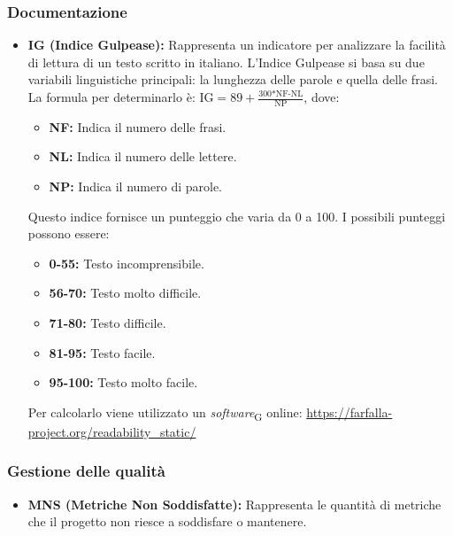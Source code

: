 \subsubsection{Documentazione}
\begin{itemize}
    \item \textbf{IG (Indice Gulpease):} Rappresenta un indicatore per analizzare la facilità di lettura di un testo scritto in italiano. L’Indice Gulpease si basa su due variabili linguistiche principali: la lunghezza delle parole e quella delle frasi. \\
    La formula per determinarlo è: \( \text{IG} = 89+\frac{\text{300*NF-NL}}{\text{NP}} \), dove:
    \begin{itemize}
        \item \textbf{NF:} Indica il numero delle frasi.
        \item \textbf{NL:} Indica il numero delle lettere.
        \item \textbf{NP:} Indica il numero di parole.
    \end{itemize}
    Questo indice fornisce un punteggio che varia da 0 a 100. I possibili punteggi possono essere:
    \begin{itemize}
        \item \textbf{0-55:} Testo incomprensibile.
        \item \textbf{56-70:} Testo molto difficile.
        \item \textbf{71-80:} Testo difficile.
        \item \textbf{81-95:} Testo facile.
        \item \textbf{95-100:} Testo molto facile.
    \end{itemize}
    Per calcolarlo viene utilizzato un \textit{software}\textsubscript{G} online: \url{https://farfalla-project.org/readability_static/}
\end{itemize}
\subsubsection{Gestione delle qualità}
\begin{itemize}
    \item \textbf{MNS (Metriche Non Soddisfatte):} Rappresenta le quantità di metriche che il progetto non riesce a soddisfare o mantenere.
\end{itemize}
\newpage
